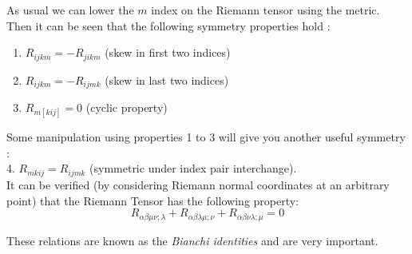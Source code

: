 
As usual we can lower the $m$ index on the Riemann tensor using the metric. Then it can be seen that the following symmetry properties hold \cite{Stephani}:
\begin{enumerate}
\item $R_{ijkm}=-R_{jikm}$ (skew in first two indices)
\item $R_{ijkm}=-R_{ijmk}$ (skew in last two indices)
\item $R_{m[kij]}=0$ (cyclic property)
\end{enumerate}
Some manipulation using properties 1 to 3 will give you another useful symmetry \cite{Lee}:\\

\hspace{0.4mm}4. $R_{mkij}=R_{ijmk}$ (symmetric under index pair interchange).\\

It can be verified (by considering Riemann normal coordinates at an arbitrary point) that the Riemann Tensor has the following property:
\begin{equation}
 R_{\alpha \beta \mu \nu ; \lambda} + R_{\alpha \beta \lambda\mu ; \nu} + R_{\alpha \beta \nu \lambda ; \mu} = 0 
 \label{eq:Bianchi}
\end{equation}
 
These relations are known as the \emph{Bianchi identities} and are very important.

